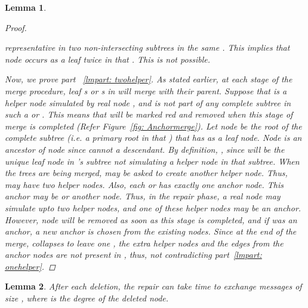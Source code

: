\documentclass[11pt, letter]{article}
\newtheorem{lemma}{Lemma}
\begin{document}
\begin{lemma}
\begin{proof}
\begin{enumerate}
\begin{enumerate}
representative in two non-intersecting subtrees in the same . This implies that node  occurs as a leaf
twice in that . This is not possible. 
 \end{enumerate}
\end{enumerate}
 Now, we prove part~ \ref{lmpart: twohelper}. As stated earlier, at each stage of the merge procedure, leaf s or
s in  will merge with their parent. Suppose that  is a helper node simulated by real node ,
and  is not part of any complete subtree in such a  or . This means that  will be marked red
and removed when this stage of merge is completed (Refer Figure~\ref{fig: Anchormerge}). Let node  be the root of the
 complete subtree (i.e. a primary root in that ) that has  as a leaf node. 
Node  is an ancestor of node  since  cannot a descendant. By definition, , since 
will be the unique leaf node in 's subtree not simulating a helper node in that subtree.
 When the trees are being merged,  may be asked to create another helper node. Thus,  may have two helper nodes.
 Also, each  or  has exactly one anchor node. This anchor may be  or another node. Thus, in the
repair phase, a real node may simulate upto two helper nodes, and one of these helper nodes may be an anchor.
 However, node  will be removed as soon as this stage is completed, and if  was an anchor, a new anchor is
chosen from the existing nodes. Since at the end of the merge,   collapses to leave one , the extra helper
nodes and the edges from the anchor nodes are not present in , thus, not contradicting part~\ref{lmpart: onehelper}.

\end{proof}
\end{lemma}

\begin{lemma}
\label{lemma: cost}
After each deletion, the repair can take  time to exchange  messages of size , where  is the degree of the deleted node.
\end{lemma}
\end{document}
